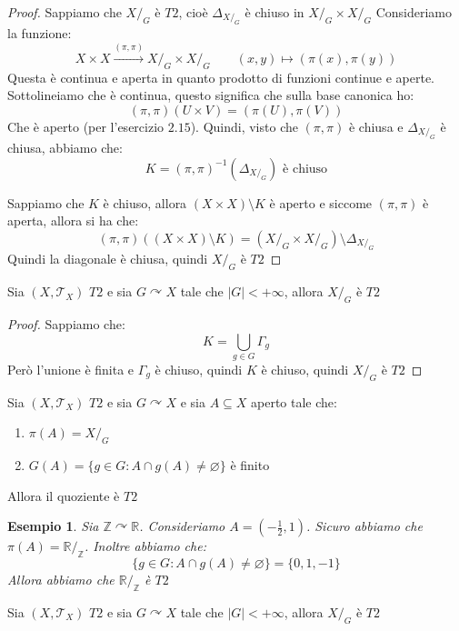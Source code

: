 \documentclass[11pt,a4paper,twoside]{article}
\newtheorem{es}{Esempio}
\theoremstyle{definition}
\begin{document}
\begin{proof}
	\fbox{$\Rightarrow$} Sappiamo che $X/_G$ è $T2$, cioè $\Delta_{X/_G}$ è chiuso in $X/_G \times X/_G$
	Consideriamo la funzione:
	\[ X \times X \xrightarrow{(\pi,\pi)} X/_G \times X/_G \qquad (x,y) \mapsto (\pi(x), \pi(y)) \]
	Questa è continua e aperta in quanto prodotto di funzioni continue e aperte. Sottolineiamo che è continua, questo significa che sulla base canonica ho:
	\[ (\pi, \pi)(U \times V) = (\pi(U), \pi(V)) \]
	Che è aperto (per l'esercizio $2.15$). Quindi, visto che $(\pi,\pi)$ è chiusa e $\Delta_{X/_G}$ è chiusa, abbiamo che:
	\[ K = (\pi, \pi)^{-1}(\Delta_{X/_G}) \text{ è chiuso}\]

	\fbox{$\Leftarrow$} Sappiamo che $K$ è chiuso, allora $(X \times X)\setminus K$ è aperto e siccome $(\pi,\pi)$ è aperta, allora si ha che:
	\[ (\pi, \pi)((X\times X) \setminus K) = (X/_G \times X/_G)\setminus \Delta_{X/_G}\]
	Quindi la diagonale è chiusa, quindi $X/_G$ è $T2$
\end{proof}

\begin{cor}{}{}
	Sia $(X, \mathcal T_X)$ $T2$ e sia $G \curvearrowright X$ tale che $|G|< + \infty$, allora $X/_G$ è $T2$
\end{cor}

\begin{proof}
	Sappiamo che:
	\[ K = \bigcup_{g \in G}\Gamma_g \]
	Però l'unione è finita e $\Gamma_g$ è chiuso, quindi $K$ è chiuso, quindi $X/_G$ è $T2$
\end{proof}

\begin{prop}{}{}\label{4.5.14}
	Sia $(X, \mathcal T_X)$ $T2$ e sia $G \curvearrowright X$ e sia $A \subseteq X$ aperto tale che:
	\begin{enumerate}
		\item $\pi(A) = X/_G$
		\item $G(A)=\{g \in G: A \cap g(A) \neq \varnothing\}$ è finito
	\end{enumerate}
	Allora il quoziente è $T2$
\end{prop}

\begin{es}
	Sia $\mathbb Z \curvearrowright \mathbb R$. Consideriamo $A = (-\frac 12, 1)$. Sicuro abbiamo che $\pi(A) = \mathbb R/_\mathbb Z$. Inoltre abbiamo che:
	\[ \{g \in G: A \cap g(A) \neq \varnothing\} = \{0,1,-1\} \]
	Allora abbiamo che $\mathbb R/_\mathbb Z$ è $T2$
\end{es}

\begin{cor}{}{}
	Sia $(X, \mathcal T_X)$ $T2$ e sia $G \curvearrowright X$ tale che $|G|< + \infty$, allora $X/_G$ è $T2$
\end{cor}
\end{document}
